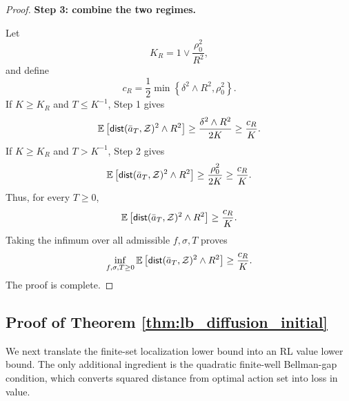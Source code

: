 \documentclass{article}
\newcommand{\1}{\mathbbm{1}}
\newcommand{\dist}{{\sf dist}}
\numberwithin{equation}{section}
\begin{document}
\begin{proof}
\medskip

\textbf{Step 3: combine the two regimes.}

Let
\[
K_R=1\vee\frac{\rho_0^2}{R^2},
\]
and define
\[
c_R=
\frac12
\min\left\{
\delta^2\wedge R^2,
\rho_0^2
\right\}.
\]
If \(K\ge K_R\) and \(T\le K^{-1}\), Step 1 gives
\[
\mathbb E\left[\dist(\bar a_T,\mathcal Z)^2\wedge R^2\right]
\ge
\frac{\delta^2\wedge R^2}{2K}
\ge
\frac{c_R}{K}.
\]
If \(K\ge K_R\) and \(T>K^{-1}\), Step 2 gives
\[
\mathbb E\left[\dist(\bar a_T,\mathcal Z)^2\wedge R^2\right]
\ge
\frac{\rho_0^2}{2K}
\ge
\frac{c_R}{K}.
\]
Thus, for every \(T\ge0\),
\[
\mathbb E\left[\dist(\bar a_T,\mathcal Z)^2\wedge R^2\right]
\ge
\frac{c_R}{K}.
\]
Taking the infimum over all admissible \(f,\sigma,T\) proves
\[
\inf_{f,\sigma,T\ge0}
\mathbb E\left[\dist(\bar a_T,\mathcal Z)^2\wedge R^2\right]
\ge
\frac{c_R}{K}.
\]
The proof is complete.
\end{proof}
\subsection{Proof of Theorem 
\ref{thm:lb_diffusion_initial}}\label{sec:proof_thm_34}

We next translate the finite-set localization lower bound into an RL value lower bound. The only additional ingredient is the quadratic finite-well Bellman-gap condition, which converts squared distance from optimal action set into loss in value.
\end{document}

